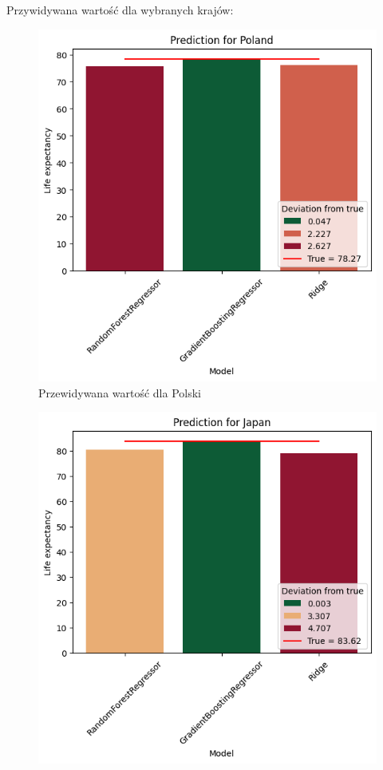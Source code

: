 \documentclass{article}
\begin{document}
\pagebreak

Przywidywana wartość dla wybranych krajów:
\begin{multicols}{2}
    \begin{figure}[H]
        \label{fig:prediction_poland}
        \includegraphics[scale=0.5]{graphs/pred_poland.png}
        \caption{Przewidywana wartość dla Polski}
        \centering
    \end{figure}
    \begin{figure}[H]
        \label{fig:prediction_japan}
        \includegraphics[scale=0.5]{graphs/pred_japan.png}

\end{figure}
\end{multicols}
\end{document}
